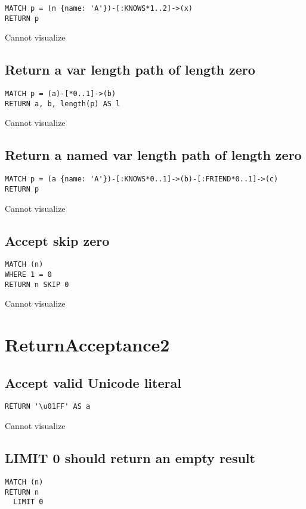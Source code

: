 \begin{lstlisting}
MATCH p = (n {name: 'A'})-[:KNOWS*1..2]->(x)
RETURN p
\end{lstlisting}

Cannot visualize
\subsection{Return a var length path of length zero}

\begin{lstlisting}
MATCH p = (a)-[*0..1]->(b)
RETURN a, b, length(p) AS l
\end{lstlisting}

Cannot visualize
\subsection{Return a named var length path of length zero}

\begin{lstlisting}
MATCH p = (a {name: 'A'})-[:KNOWS*0..1]->(b)-[:FRIEND*0..1]->(c)
RETURN p
\end{lstlisting}

Cannot visualize
\subsection{Accept skip zero}

\begin{lstlisting}
MATCH (n)
WHERE 1 = 0
RETURN n SKIP 0
\end{lstlisting}

Cannot visualize
\section{ReturnAcceptance2}

\subsection{Accept valid Unicode literal}

\begin{lstlisting}
RETURN '\u01FF' AS a
\end{lstlisting}

Cannot visualize
\subsection{LIMIT 0 should return an empty result}

\begin{lstlisting}
MATCH (n)
RETURN n
  LIMIT 0
\end{lstlisting}

